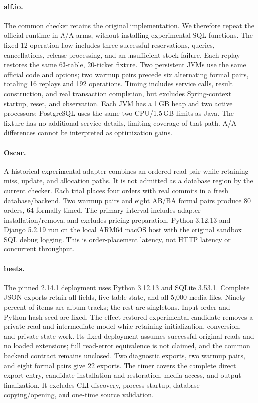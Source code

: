 \documentclass[acmsmall,screen,review,anonymous]{acmart}
\begin{document}
\paragraph{alf.io.}
The common checker retains the original implementation. We therefore repeat
the official runtime in A/A arms, without installing experimental SQL functions.
The fixed 12-operation flow includes three successful reservations, queries,
cancellations, release processing, and an insufficient-stock failure. Each
replay restores the same 63-table, 20-ticket fixture. Two persistent JVMs use
the same official code and options; two warmup pairs precede six alternating
formal pairs, totaling 16 replays and 192 operations. Timing includes service
calls, result construction, and real transaction completion, but excludes
Spring-context startup, reset, and observation. Each JVM has a 1\,GB heap and
two active processors; PostgreSQL uses the same two-CPU/1.5\,GB limits as Java.
The fixture has no additional-service details, limiting coverage of that path.
A/A differences cannot be interpreted as optimization gains.

\paragraph{Oscar.}
A historical experimental adapter combines an ordered read pair while retaining
miss, update, and allocation paths. It is not admitted as a database region by
the current checker. Each trial places four orders with real commits in a fresh
database/backend. Two warmup pairs and eight AB/BA formal pairs produce 80 orders,
64 formally timed. The primary interval includes adapter installation/removal
and excludes pricing preparation. Python 3.12.13 and Django 5.2.19 run on the
local ARM64 macOS host with the original sandbox SQL debug logging. This is
order-placement latency, not HTTP latency or concurrent throughput.

\paragraph{beets.}
The pinned 2.14.1 deployment uses Python 3.12.13 and SQLite 3.53.1. Complete
JSON exports retain all fields, five-table state, and all 5,000 media files.
Ninety percent of items are album tracks; the rest are singletons. Input order
and Python hash seed are fixed. The effect-restored experimental candidate
removes a private read and intermediate model while retaining initialization,
conversion, and private-state work. Its fixed deployment assumes successful
original reads and no loaded extensions; full read-error equivalence is not
claimed, and the common backend contract remains unclosed.
Two diagnostic exports, two warmup pairs, and eight formal pairs give 22 exports.
The timer covers the complete direct export entry, candidate installation and
restoration, media access, and output finalization. It excludes CLI discovery,
process startup, database copying/opening, and one-time source validation.
\end{document}
